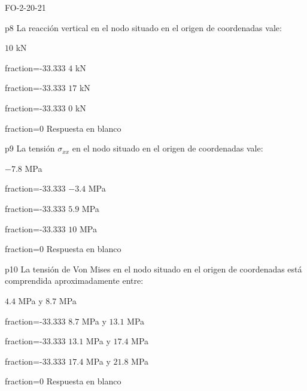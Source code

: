 \documentclass[a4paper]{article}
\begin{document}
\begin{quiz}{FO-2-20-21}
\begin{multi}{p8}
	La reacci\'on vertical en el nodo situado en el origen de coordenadas vale:
	\item* $10$ kN
	\item[fraction=-33.333] $4$ kN
	\item[fraction=-33.333] $17$ kN
	\item[fraction=-33.333] $0$ kN
	\item[fraction=0] Respuesta en blanco
\end{multi}
\begin{multi}{p9}
La tensi\'on $\sigma_{xx}$ en el nodo situado en el origen de coordenadas
vale:
\item* $-7.8$ MPa
\item[fraction=-33.333] $-3.4$ MPa
\item[fraction=-33.333] $5.9$ MPa
\item[fraction=-33.333] $10$ MPa
\item[fraction=0] Respuesta en blanco
\end{multi}
\begin{multi}{p10}
La tensi\'on de Von Mises en el nodo situado en el origen de coordenadas est\'a
comprendida aproximadamente entre:
	\item* $4.4$ MPa y $8.7$ MPa
	\item[fraction=-33.333] $8.7$ MPa y $13.1$ MPa
	\item[fraction=-33.333] $13.1$ MPa y $17.4$ MPa
	\item[fraction=-33.333] $17.4$ MPa y $21.8$ MPa
	\item[fraction=0] Respuesta en blanco
\end{multi}

\end{quiz}
\end{document}
